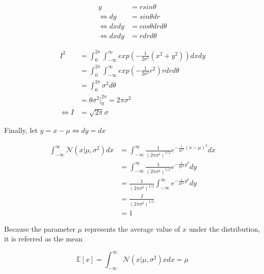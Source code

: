 \begin{equation}
    \begin{split}
        y & = rsin\theta\\
        \Leftrightarrow dy & = sin \theta dr\\
        \Leftrightarrow dxdy & = cos \theta drd\theta\\
        \Leftrightarrow dxdy & = r drd\theta
    \end{split}
\end{equation}

\begin{equation}
    \begin{split}
        I^2 & = \int_{0}^{2 \pi} \int_{- \infty}^{\infty} exp(- \frac{1}{2 \sigma^2}(x^2 + y^2) )dxdy\\
        & = \int_{0}^{2 \pi} \int_{- \infty}^{\infty} exp(- \frac{1}{2 \sigma^2}r^2 )r drd\theta\\
        & = \int_{0}^{2 \pi} \sigma^2 d\theta\\
        & = \theta \sigma^2 |_{0}^{2\pi} = 2 \pi \sigma^2\\
        \Leftrightarrow I & = \sqrt{2 \pi}\sigma
    \end{split}
\end{equation}

Finally, let $y = x - \mu \Leftrightarrow dy = dx$

\begin{equation}
    \begin{split}
        \int_{- \infty}^{\infty} \mathcal{N}(x | \mu, \sigma^2)dx & = \int_{- \infty}^{\infty} \frac{1}{(2\pi \sigma ^2)^{1/2}} e^{-\frac{1}{2\sigma^2}(x - \mu)^2}dx\\
        & = \int_{- \infty}^{\infty} \frac{1}{(2\pi \sigma ^2)^{1/2}} e^{-\frac{1}{2\sigma^2}y^2}dy\\
        & = \frac{1}{(2\pi \sigma ^2)^{1/2}} \int_{- \infty}^{\infty} e^{-\frac{1}{2\sigma^2}y^2}dy\\
        & = \frac{I}{(2\pi \sigma ^2)^{1/2}}\\
        & = 1
    \end{split}
\end{equation}

Because the parameter $\mu$ represents the average value of $x$ under the distribution, it is referred as the mean

\begin{equation}
    \mathbb{E}[x] = \int_{- \infty}^{\infty} \mathcal{N}(x | \mu, \sigma^2)xdx = \mu
\end{equation}


